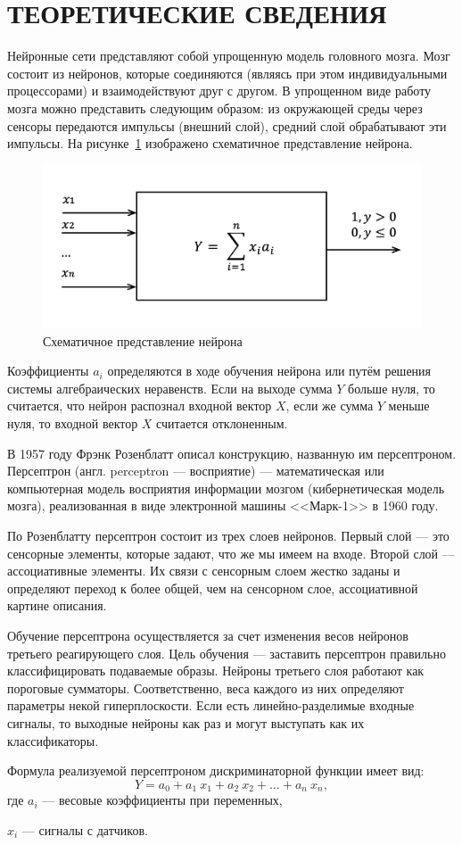 \section{ТЕОРЕТИЧЕСКИЕ СВЕДЕНИЯ}

Нейронные сети представляют собой упрощенную модель головного мозга.
Мозг состоит из нейронов, которые соединяются (являясь при этом
индивидуальными процессорами) и взаимодействуют друг с другом.
В упрощенном виде работу мозга можно представить следующим образом:
из окружающей среды через сенсоры передаются импульсы (внешний слой),
средний слой обрабатывают эти импульсы. На рисунке~\ref{fig:neuron}
изображено схематичное представление нейрона.
\begin{figure}[h!]
  \centering
  \includegraphics[width=130mm]{img/neuron}
  \caption{Схематичное представление нейрона}
  \label{fig:neuron}
\end{figure}

Коэффициенты $a_i$ определяются в ходе обучения нейрона или путём
решения системы алгебраических неравенств. Если на выходе сумма $Y$
больше нуля, то считается, что нейрон распознал входной вектор $X$,
если же сумма $Y$ меньше нуля, то входной вектор $X$ считается отклоненным.   

В 1957 году Фрэнк Розенблатт описал конструкцию, названную им персептроном.
Персептрон (англ. perceptron --- восприятие) --- математическая
или компьютерная модель восприятия информации мозгом (кибернетическая
модель мозга), реализованная в виде электронной машины <<Марк-1>> в 1960 году.

По Розенблатту персептрон состоит из трех слоев нейронов.
Первый слой --- это сенсорные элементы, которые задают, что же мы имеем на входе.
Второй слой –-- ассоциативные элементы. Их связи с сенсорным слоем жестко
заданы и определяют переход к более общей, чем на сенсорном слое,
ассоциативной картине описания.

Обучение персептрона осуществляется за счет изменения весов нейронов
третьего реагирующего слоя. Цель обучения --– заставить персептрон
правильно классифицировать подаваемые образы.
Нейроны третьего слоя работают как пороговые сумматоры.
Соответственно, веса каждого из них определяют параметры некой гиперплоскости.
Если есть линейно-разделимые входные сигналы, то выходные нейроны
как раз и могут выступать как их классификаторы.

Формула реализуемой персептроном дискриминаторной функции имеет вид:
\begin{equation}
\label{eq:Y}
  Y = a_0 + a_1 \: x_1 + a_2 \: x_2 + \dots + a_n \: x_n,
\end{equation}
где \hspace{2mm} $a_i$ --- весовые коэффициенты при переменных, \par
$x_i$ --- сигналы с датчиков.

\newpage